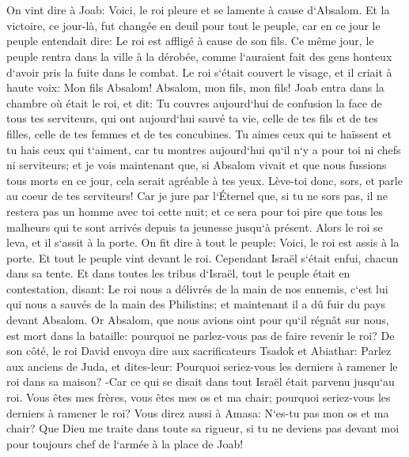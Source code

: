 \chapter{}

\verse On vint dire à Joab: Voici, le roi pleure et se lamente à cause d`Absalom. 
\verse Et la victoire, ce jour-là, fut changée en deuil pour tout le peuple, car en ce jour le peuple entendait dire: Le roi est affligé à cause de son fils. 
\verse Ce même jour, le peuple rentra dans la ville à la dérobée, comme l`auraient fait des gens honteux d`avoir pris la fuite dans le combat. 
\verse Le roi s`était couvert le visage, et il criait à haute voix: Mon fils Absalom! Absalom, mon fils, mon fils! 
\verse Joab entra dans la chambre où était le roi, et dit: Tu couvres aujourd`hui de confusion la face de tous tes serviteurs, qui ont aujourd`hui sauvé ta vie, celle de tes fils et de tes filles, celle de tes femmes et de tes concubines. 
\verse Tu aimes ceux qui te haïssent et tu hais ceux qui t`aiment, car tu montres aujourd`hui qu`il n`y a pour toi ni chefs ni serviteurs; et je vois maintenant que, si Absalom vivait et que nous fussions tous morts en ce jour, cela serait agréable à tes yeux. 
\verse Lève-toi donc, sors, et parle au coeur de tes serviteurs! Car je jure par l`Éternel que, si tu ne sors pas, il ne restera pas un homme avec toi cette nuit; et ce sera pour toi pire que tous les malheurs qui te sont arrivés depuis ta jeunesse jusqu`à présent. 
\verse Alors le roi se leva, et il s`assit à la porte. On fit dire à tout le peuple: Voici, le roi est assis à la porte. Et tout le peuple vint devant le roi. Cependant Israël s`était enfui, chacun dans sa tente. 
\verse Et dans toutes les tribus d`Israël, tout le peuple était en contestation, disant: Le roi nous a délivrés de la main de nos ennemis, c`est lui qui nous a sauvés de la main des Philistins; et maintenant il a dû fuir du pays devant Absalom. 
\verse Or Absalom, que nous avions oint pour qu`il régnât sur nous, est mort dans la bataille: pourquoi ne parlez-vous pas de faire revenir le roi? 
\verse De son côté, le roi David envoya dire aux sacrificateurs Tsadok et Abiathar: Parlez aux anciens de Juda, et dites-leur: Pourquoi seriez-vous les derniers à ramener le roi dans sa maison? -Car ce qui se disait dans tout Israël était parvenu jusqu`au roi. 
\verse Vous êtes mes frères, vous êtes mes os et ma chair; pourquoi seriez-vous les derniers à ramener le roi? 
\verse Vous direz aussi à Amasa: N`es-tu pas mon os et ma chair? Que Dieu me traite dans toute sa rigueur, si tu ne deviens pas devant moi pour toujours chef de l`armée à la place de Joab! 
